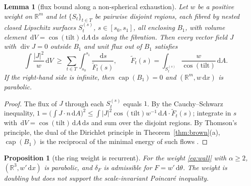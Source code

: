 \documentclass[11pt]{amsart}
\newcommand{\R}{\mathbb{R}}
\newcommand{\dd}{\,\mathrm{d}}
\newcommand{\abs}[1]{\lvert #1\rvert}
\DeclareMathOperator{\capa}{cap}
\DeclareMathOperator{\divg}{div}
\theoremstyle{plain}
\newtheorem{proposition}[theorem]{Proposition}
\newtheorem{lemma}[theorem]{Lemma}
\theoremstyle{definition}
\theoremstyle{remark}
\begin{document}
\begin{lemma}[flux bound along a non-spherical exhaustion]\label{lem:thomson}
Let $w$ be a positive weight on $\R^m$ and let $\{S_t\}_{t\in T}$ be pairwise
disjoint regions, each fibred by nested closed Lipschitz surfaces $S_t^{(s)}$,
$s\in[s_0,s_1]$, all enclosing $B_1$, with volume element
$\dd V=\cos(\mathrm{tilt})\dd A\dd s$ along the fibration. Then every vector
field $J$ with $\divg J=0$ outside $B_1$ and unit flux out of $B_1$ satisfies
\[
\int\frac{\abs J^2}{w}\dd V\ \ge\ \sum_{t\in T}\int_{s_0}^{s_1}\frac{\dd s}{\tilde F_t(s)},
\qquad \tilde F_t(s)=\int_{S_t^{(s)}}\frac{w}{\cos(\mathrm{tilt})}\dd A .
\]
If the right-hand side is infinite, then $\capa(B_1)=0$ and $(\R^m,w\dd x)$ is
parabolic.
\end{lemma}

\begin{proof}
The flux of $J$ through each $S_t^{(s)}$ equals $1$. By the Cauchy--Schwarz
inequality,
$1=\bigl(\int J\cdot n\dd A\bigr)^2\le\int\abs{J}^2\cos(\mathrm{tilt})w^{-1}\dd A
\cdot\tilde F_t(s)$; integrate in $s$ with $\dd V=\cos(\mathrm{tilt})\dd A\dd s$
and sum over the disjoint regions. By Thomson's principle, the dual of the
Dirichlet principle in Theorem~\ref{thm:brown}(a), $\capa(B_1)$ is the
reciprocal of the minimal energy of such flows \cite[\S7]{grigoryan1999}.
\end{proof}

\begin{proposition}[the ring weight is recurrent]\label{prop:wall}
For the weight \eqref{eq:wall} with $\alpha\ge2$, $(\R^3,w'\dd x)$ is parabolic,
and $\delta_F$ is admissible for $F=w'\dd\theta$. The weight is doubling but does
not support the scale-invariant Poincar\'e inequality.
\end{proposition}
\end{document}
